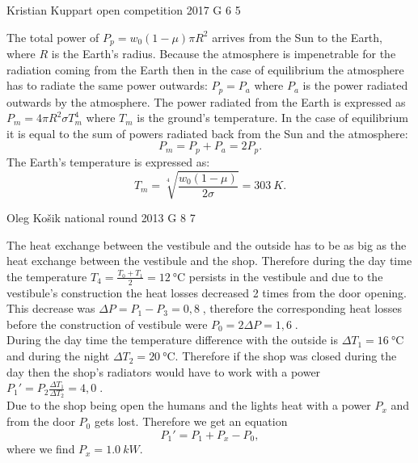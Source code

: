 \documentclass[11pt]{article}
\begin{document}
{Kristian Kuppart} %
{open competition} %
{2017} %
{G 6} %
{5} %
{

\ifEngSolution
The total power of $P_p=w_0 \left(1-\mu\right)\pi R^2$ arrives from the Sun to the Earth, where $R$ is the Earth’s radius. Because the atmosphere is impenetrable for the radiation coming from the Earth then in the case of equilibrium the atmosphere has to radiate the same power outwards: $P_p=P_a$ where $P_a$ is the power radiated outwards by the atmosphere. The power radiated from the Earth is expressed as $P_m=4 \pi R^2 \sigma T_m^4$ where $T_m$ is the ground’s temperature. In the case of equilibrium it is equal to the sum of powers radiated back from the Sun and the atmosphere:
\[P_m=P_p+P_a=2P_p.\]
The Earth’s temperature is expressed as:
\[T_m=\sqrt[4]{\frac{w_0\left(1-\mu\right)}{2\sigma}}=\SI{303}{K}.\]
\fi
}

{Oleg Košik} %
{national round} %
{2013} %
{G 8} %
{7} %
{

\ifEngSolution
The heat exchange between the vestibule and the outside has to be as big as the heat exchange between the vestibule and the shop. Therefore during the day time the temperature $T_4=\frac{T_0+T_1}{2}=\SI{12}{\celsius}$ persists in the vestibule and due to the vestibule’s construction the heat losses decreased 2 times from the door opening. This decrease was $\Delta P=P_1-P_3=0,8\;$, therefore the corresponding heat losses before the construction of vestibule were $P_0=2\Delta P=1,6\;$. \\
During the day time the temperature difference with the outside is $\Delta T_1=\SI{16}{\celsius}$ and during the night $\Delta T_2=\SI{20}{\celsius}$. Therefore if the shop was closed during the day then the shop’s radiators would have to work with a power $P_1'=P_2\frac{\Delta T_1}{\Delta T_2}=4,0\;$.\\
Due to the shop being open the humans and the lights heat with a power $P_x$ and from the door $P_0$ gets lost. Therefore we get an equation
\[
P_1'=P_1+P_x-P_0,
\]
where we find $P_x=\SI{1,0}{kW}$.
\fi
}
\end{document}
